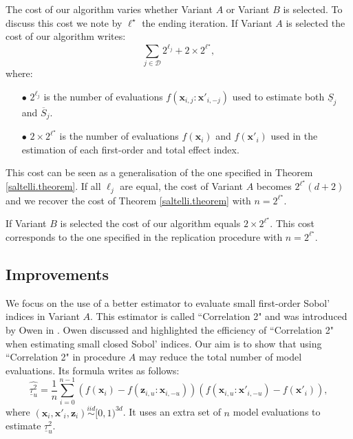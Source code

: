 \documentclass[]{elsarticle}
\theoremstyle{definition}
\newcommand{\bvec}[1]{\boldsymbol{#1}}
\newcommand{\vx}{\bvec{x}}
\newcommand{\vz}{\bvec{z}}
\newcommand\iid{\stackrel{iid}{\sim}}
\begin{document}
The cost of our algorithm varies whether Variant $A$ or Variant $B$ is selected. To discuss this cost we note by $\ell^\star$ the ending iteration. If Variant $A$ is selected the cost of our algorithm writes:
\begin{equation*}
\sum \limits_{j \in \mathcal{D}} 2^{\ell_j} + 2 \times 2^{\ell^{\star}},
\end{equation*}
where: 
\begin{itemize}
\item[$\bullet$] $2^{\ell_j}$ is the number of evaluations $f\left(\vx_{i,j}:{\vx'}_{i,-j}\right)$ used to estimate both $\underline{S}_j$ and $\overline{S}_j$.
\item[$\bullet$] $2 \times 2^{\ell^{\star}}$ is the number of evaluations $f\left(\vx_{i}\right)$ and $f\left({\vx'}_{i}\right)$ used in the estimation of each first-order and total effect index.
\end{itemize}
This cost can be seen as a generalisation of the one specified in Theorem \ref{saltelli.theorem}. If all $\ell_j$ are equal, the cost of Variant $A$ becomes $2^{\ell^\star}(d+2)$ and we recover the cost of Theorem \ref{saltelli.theorem} with $n=2^{\ell^\star}$.

If Variant $B$ is selected the cost of our algorithm equals $2 \times 2^{\ell^{\star}}$. This cost corresponds to the one specified in the replication procedure with $n=2^{\ell^{\star}}$.

\subsection{Improvements}

We focus on the use of a better estimator to evaluate small first-order Sobol' indices in Variant $A$. This estimator is called ``Correlation 2" and was introduced by Owen in \cite{Owen}. Owen discussed and highlighted the efficiency of ``Correlation 2" when estimating small closed Sobol' indices. Our aim is to show that using ``Correlation 2" in procedure $A$ may reduce the total number of model evaluations. Its formula writes as follows:
\begin{equation}
\widehat{\underline{\tau}_u^2} = \frac{1}{n} \sum \limits_{i=0}^{n-1} (f(\vx_i)-f({\vz}_{i,u}:{\vx}_{i,-u}))(f(\vx_{i,u}:{\vx'}_{i,-u})-f({\vx'}_i)),
\label{correlation2}
\end{equation}
where $(\vx_i,{\vx'}_i, \vz_i) \iid [0,1)^{3d}$. It uses an extra set of $n$ model evaluations to estimate $\underline{\tau}_u^2$.
\bigskip
\end{document}
